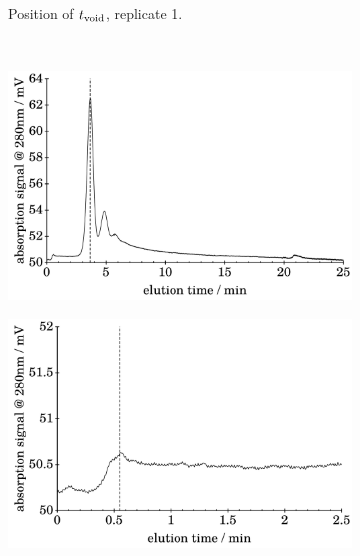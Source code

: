 \begin{figure}[h]
\begin{center}
\begin{subfigure}{0.49\linewidth}
{      Position of $t_\text{void}$, replicate 1.}
  \end{subfigure}
  \\\vspace*{2em}
      \begin{subfigure}{0.49\linewidth}
    \includegraphics[width=\linewidth]{./images/data/img_BSA_VC_2_5_r2_te.pdf}
    \label{subfig:raw_BSA2_5_r2_te}
  \end{subfigure}
  \begin{subfigure}{0.49\linewidth}
    \includegraphics[width=\linewidth]{./images/data/img_BSA_VC_2_5_r2_t0.pdf}
  \end{subfigure}
  \\\vspace*{2em}

\end{center}
\end{figure}
